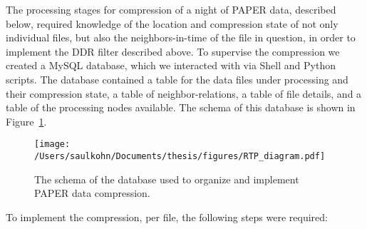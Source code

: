 The processing stages for compression of a night of PAPER data, described below, required knowledge of the location and compression state of not only individual files, but also the neighbors-in-time of the file in question, in order to implement the DDR filter described above. To supervise the compression we created a MySQL database, which we interacted with via Shell and Python scripts. The database contained a table for the data files under processing and their compression state, a table of neighbor-relations, a table of file details, and a table of the processing nodes available. The schema of this database is shown in Figure~\ref{fig:database_schema}.

\begin{figure}[h]
\centering
\texttt{[image: /Users/saulkohn/Documents/thesis/figures/RTP\_diagram.pdf]}
\caption[The schema of the database used to organize and implement PAPER data compression.]{The schema of the database used to organize and implement PAPER data compression.}
\label{fig:database_schema}
\end{figure}

To implement the compression, per file, the following steps were required:

